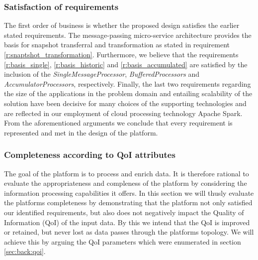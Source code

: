 \subsubsection*{Satisfaction of requirements}
The first order of business is whether the proposed design satisfies the earlier stated requirements. The message-passing micro-service architecture provides the basis for snapshot transferral and transformation as stated in requirement \ref{r:snaptshot_transformation}. Furthermore, we believe that the requirements \ref{r:basis_single}, \ref{r:basis_historic} and \ref{r:basis_accumulated} are satisfied by the inclusion of the \emph{SingleMessageProcessor}, \emph{BufferedProcessors} and \emph{AccumulatorProcessors}, respectively. Finally, the last two requirements regarding the size of the applications in the problem domain and entailing scalability of the solution have been decisive for many choices of the supporting technologies and are reflected in our employment of cloud processing technology Apache Spark. From the aforementioned arguments we conclude that every requirement is represented and met in the design of the platform.

\subsubsection*{Completeness according to QoI attributes}
The goal of the platform is to process and enrich data. It is therefore rational to evaluate the appropriateness and compleness of the platform by considering the information processing capabilities it offers. In this section we will thusly evaluate the platforms completeness by demonstrating that the platform not only satisfied our identified requirements, but also does not negatively impact the Quality of Information (QoI) of the input data. By this we intend that the QoI is improved or retained, but never lost as data passes through the platforms topology. We will achieve this by arguing the QoI parameters which were enumerated in section \ref{sec:back:qoi}. 

